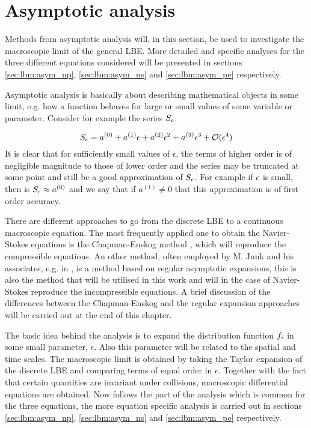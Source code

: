\section{Asymptotic analysis}\label{sec:lbm:asym}
Methods from asymptotic analysis will, in this section, be used to
investigate the macroscopic limit of the general LBE. More detailed and
specific analyses for the three different equations considered will be
presented in sections \ref{sec:lbm:asym_np}, \ref{sec:lbm:asym_ns} and
\ref{sec:lbm:asym_pe} respectively. 

Asymptotic analysis is basically about describing mathematical objects
in some limit, e.g. how a function behaves for large or small values
of some variable or parameter. Consider for example the series $S_{\epsilon}$:

\begin{equation}
S_{\epsilon} = a^{(0)} + a^{(1)}\epsilon + a^{(2)}\epsilon^2 +
a^{(3)}\epsilon^3 + \mathcal{O}(\epsilon^4)
\end{equation}
It is clear that for sufficiently small values of $\epsilon$, the
terms of higher order is of negligible magnitude to those of lower
order and the series may be truncated at some point and still be a
good approximation of $S_{\epsilon}$. For example if $\epsilon$ is small, then
is $S_{\epsilon} \approx a^{(0)}$ and we say that if $a^{(1)} \neq 0$ that
this approximation is of first order accuracy.

There are different approaches to go from the discrete LBE to a
continuous macroscopic equation. The most frequently applied one to
obtain the Navier-Stokes equations is the Chapman-Enskog method
\cite{junk-boundary}, which will reproduce the compressible
equations. An other method, often employed by M. Junk and his
associates, e.g. in \cite{junk-asym}, is a method based on regular
asymptotic expansions, this is also the method that will be utilised
in this work and will in the case of Navier-Stokes reproduce the
incompressible equations. A brief discussion of the differences
between the Chapman-Enskog and the regular expansion approaches will
be carried out at the end of this chapter.

The basic idea behind the analysis is to expand the distribution
function $f_i$ in some small parameter, $\epsilon$. Also this
parameter will be related to the spatial and time scales. The
macroscopic limit is obtained by taking the Taylor expansion of the
discrete LBE and comparing terms of equal order in
$\epsilon$. Together with the fact that certain quantities are
invariant under collisions, macroscopic differential equations are
obtained. Now follows the part of the analysis which is common for the
three equations, the more equation specific analysis is carried out in
sections \ref{sec:lbm:asym_np}, \ref{sec:lbm:asym_ns} and
\ref{sec:lbm:asym_pe} respectively.


